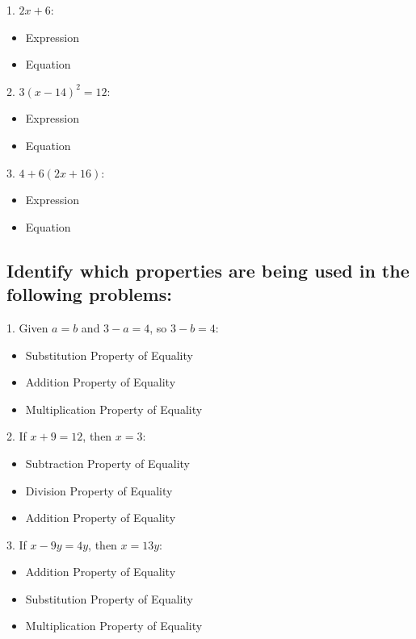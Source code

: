 1. $2x + 6$:

\begin{itemize}
    \item [ ] Expression
    \item [ ] Equation
\end{itemize}

2. $3(x - 14)^2 = 12$:

\begin{itemize}
    \item [ ] Expression
    \item [ ] Equation
\end{itemize}

3. $4 + 6(2x + 16)$:

\begin{itemize}
    \item [ ] Expression
    \item [ ] Equation
\end{itemize}


\subsection{Identify which properties are being used in the following problems:}
\label{sss:iden-f90a}




1. Given $a = b$ and $3 - a = 4$, so $3 - b = 4$:

\begin{itemize}
    \item [ ] Substitution Property of Equality
    \item [ ] Addition Property of Equality
    \item [ ] Multiplication Property of Equality
\end{itemize}

2. If $x + 9 = 12$, then $x = 3$:

\begin{itemize}
    \item [ ] Subtraction Property of Equality
    \item [ ] Division Property of Equality
    \item [ ] Addition Property of Equality
\end{itemize}

3. If $x - 9y = 4y$, then $x = 13y$:

\begin{itemize}
    \item [ ] Addition Property of Equality
    \item [ ] Substitution Property of Equality
    \item [ ] Multiplication Property of Equality
\end{itemize}



